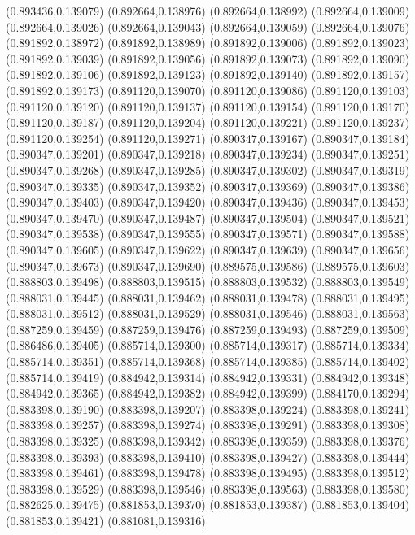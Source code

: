 (0.893436,0.139079)
(0.892664,0.138976)
(0.892664,0.138992)
(0.892664,0.139009)
(0.892664,0.139026)
(0.892664,0.139043)
(0.892664,0.139059)
(0.892664,0.139076)
(0.891892,0.138972)
(0.891892,0.138989)
(0.891892,0.139006)
(0.891892,0.139023)
(0.891892,0.139039)
(0.891892,0.139056)
(0.891892,0.139073)
(0.891892,0.139090)
(0.891892,0.139106)
(0.891892,0.139123)
(0.891892,0.139140)
(0.891892,0.139157)
(0.891892,0.139173)
(0.891120,0.139070)
(0.891120,0.139086)
(0.891120,0.139103)
(0.891120,0.139120)
(0.891120,0.139137)
(0.891120,0.139154)
(0.891120,0.139170)
(0.891120,0.139187)
(0.891120,0.139204)
(0.891120,0.139221)
(0.891120,0.139237)
(0.891120,0.139254)
(0.891120,0.139271)
(0.890347,0.139167)
(0.890347,0.139184)
(0.890347,0.139201)
(0.890347,0.139218)
(0.890347,0.139234)
(0.890347,0.139251)
(0.890347,0.139268)
(0.890347,0.139285)
(0.890347,0.139302)
(0.890347,0.139319)
(0.890347,0.139335)
(0.890347,0.139352)
(0.890347,0.139369)
(0.890347,0.139386)
(0.890347,0.139403)
(0.890347,0.139420)
(0.890347,0.139436)
(0.890347,0.139453)
(0.890347,0.139470)
(0.890347,0.139487)
(0.890347,0.139504)
(0.890347,0.139521)
(0.890347,0.139538)
(0.890347,0.139555)
(0.890347,0.139571)
(0.890347,0.139588)
(0.890347,0.139605)
(0.890347,0.139622)
(0.890347,0.139639)
(0.890347,0.139656)
(0.890347,0.139673)
(0.890347,0.139690)
(0.889575,0.139586)
(0.889575,0.139603)
(0.888803,0.139498)
(0.888803,0.139515)
(0.888803,0.139532)
(0.888803,0.139549)
(0.888031,0.139445)
(0.888031,0.139462)
(0.888031,0.139478)
(0.888031,0.139495)
(0.888031,0.139512)
(0.888031,0.139529)
(0.888031,0.139546)
(0.888031,0.139563)
(0.887259,0.139459)
(0.887259,0.139476)
(0.887259,0.139493)
(0.887259,0.139509)
(0.886486,0.139405)
(0.885714,0.139300)
(0.885714,0.139317)
(0.885714,0.139334)
(0.885714,0.139351)
(0.885714,0.139368)
(0.885714,0.139385)
(0.885714,0.139402)
(0.885714,0.139419)
(0.884942,0.139314)
(0.884942,0.139331)
(0.884942,0.139348)
(0.884942,0.139365)
(0.884942,0.139382)
(0.884942,0.139399)
(0.884170,0.139294)
(0.883398,0.139190)
(0.883398,0.139207)
(0.883398,0.139224)
(0.883398,0.139241)
(0.883398,0.139257)
(0.883398,0.139274)
(0.883398,0.139291)
(0.883398,0.139308)
(0.883398,0.139325)
(0.883398,0.139342)
(0.883398,0.139359)
(0.883398,0.139376)
(0.883398,0.139393)
(0.883398,0.139410)
(0.883398,0.139427)
(0.883398,0.139444)
(0.883398,0.139461)
(0.883398,0.139478)
(0.883398,0.139495)
(0.883398,0.139512)
(0.883398,0.139529)
(0.883398,0.139546)
(0.883398,0.139563)
(0.883398,0.139580)
(0.882625,0.139475)
(0.881853,0.139370)
(0.881853,0.139387)
(0.881853,0.139404)
(0.881853,0.139421)
(0.881081,0.139316)
